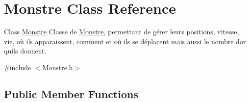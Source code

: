\hypertarget{classMonstre}{}\section{Monstre Class Reference}
\label{classMonstre}


Class \hyperlink{classMonstre}{Monstre} Classe de \hyperlink{classMonstre}{Monstre}, permettant de gérer leurs positions, vitesse, vie, où ils apparaissent, comment et où ils se déplacent mais aussi le nombre d\textquotesingle{}or qu\textquotesingle{}ils donnent.  




{\ttfamily \#include $<$Monstre.\+h$>$}

\subsection*{Public Member Functions}
